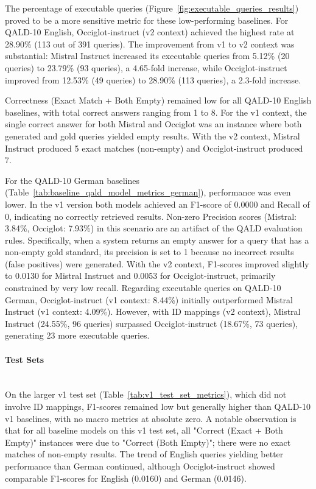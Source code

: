 The percentage of executable queries (Figure~\ref{fig:executable_queries_results}) proved to be a more sensitive metric for these low-performing baselines.
For QALD-10 English, Occiglot-instruct (v2 context) achieved the highest rate at 28.90\% (113 out of 391 queries). 
The improvement from v1 to v2 context was substantial: Mistral Instruct increased its executable queries from 5.12\% (20 queries) to 23.79\% (93 queries), a 4.65-fold increase, while Occiglot-instruct improved from 12.53\% (49 queries) to 28.90\% (113 queries), a 2.3-fold increase.

Correctness (Exact Match + Both Empty) remained low for all QALD-10 English baselines, with total correct answers ranging from 1 to 8. 
For the v1 context, the single correct answer for both Mistral and Occiglot was an instance where both generated and gold queries yielded empty results. 
With the v2 context, Mistral Instruct produced 5 exact matches (non-empty) and Occiglot-instruct produced 7.

For the QALD-10 German baselines (Table~\ref{tab:baseline_qald_model_metrics_german}), performance was even lower. 
In the v1 version both models achieved an F1-score of 0.0000 and Recall of 0, indicating no correctly retrieved results.
Non-zero Precision scores (Mistral: 3.84\%, Occiglot: 7.93\%) in this scenario are an artifact of the QALD evaluation rules. Specifically, when a system returns an empty answer for a query that has a non-empty gold standard, its precision is set to 1 because no incorrect results (false positives) were generated. 
With the v2 context, F1-scores improved slightly to 0.0130 for Mistral Instruct and 0.0053 for Occiglot-instruct, primarily constrained by very low recall. 
Regarding executable queries on QALD-10 German, Occiglot-instruct (v1 context: 8.44\%) initially outperformed Mistral Instruct (v1 context: 4.09\%).
However, with ID mappings (v2 context), Mistral Instruct (24.55\%, 96 queries) surpassed Occiglot-instruct (18.67\%, 73 queries), generating 23 more executable queries.

\paragraph{Test Sets} \mbox{}\\
On the larger v1 test set (Table~\ref{tab:v1_test_set_metrics}), which did not involve ID mappings, F1-scores remained low but generally higher than QALD-10 v1 baselines, with no macro metrics at absolute zero. 
A notable observation is that for all baseline models on this v1 test set, all "Correct (Exact + Both Empty)" instances were due to "Correct (Both Empty)"; there were no exact matches of non-empty results. 
The trend of English queries yielding better performance than German continued, although Occiglot-instruct showed comparable F1-scores for English (0.0160) and German (0.0146).

